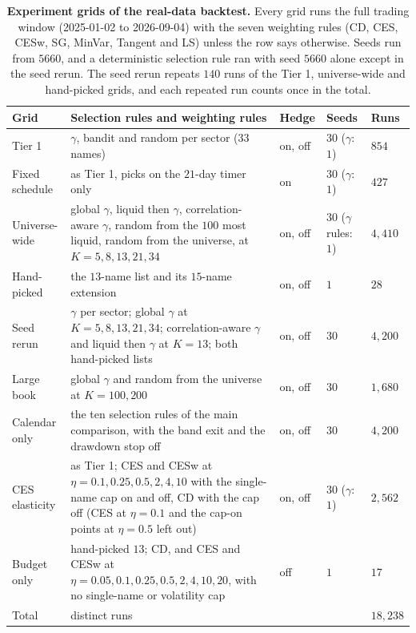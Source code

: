 \begin{table}[H]
\centering
\small
\caption{\textbf{Experiment grids of the real-data backtest.} Every grid runs the full trading window
(2025-01-02 to 2026-09-04) with the seven weighting rules (CD, CES, CESw, SG, MinVar, Tangent and LS) unless the
row says otherwise. Seeds run from $5660$, and a deterministic selection rule ran with seed $5660$ alone except in
the seed rerun. The seed rerun repeats $140$ runs of the Tier 1, universe-wide and hand-picked grids, and each repeated run counts
once in the total.}
\label{tab:S-grids}
\begin{tabular}{@{}p{2.2cm}p{5.4cm}lll@{}}
\toprule
\textbf{Grid} & \textbf{Selection rules and weighting rules} & \textbf{Hedge} & \textbf{Seeds} &
  \textbf{Runs} \\
\midrule
Tier 1 & $\gamma$, bandit and random per sector ($33$ names) & on, off & $30$ ($\gamma$: $1$) & $854$ \\
Fixed schedule & as Tier 1, picks on the $21$-day timer only & on & $30$ ($\gamma$: $1$) & $427$ \\
Universe-wide & global $\gamma$, liquid then $\gamma$, correlation-aware $\gamma$, random from the $100$ most
  liquid, random from the universe, at $K = 5, 8, 13, 21, 34$ & on, off & $30$ ($\gamma$ rules: $1$) &
  $4{,}410$ \\
Hand-picked & the $13$-name list and its $15$-name extension & on, off & $1$ & $28$ \\
Seed rerun & $\gamma$ per sector; global $\gamma$ at $K = 5, 8, 13, 21, 34$; correlation-aware $\gamma$ and liquid
  then $\gamma$ at $K = 13$; both hand-picked lists & on, off & $30$ & $4{,}200$ \\
Large book & global $\gamma$ and random from the universe at $K = 100, 200$ & on, off & $30$ & $1{,}680$ \\
Calendar only & the ten selection rules of the main comparison, with the band exit and the drawdown stop off &
  on, off & $30$ & $4{,}200$ \\
CES elasticity & as Tier 1; CES and CESw at $\eta = 0.1, 0.25, 0.5, 2, 4, 10$ with the single-name cap on and
  off, CD with the cap off (CES at $\eta = 0.1$ and the cap-on points at $\eta = 0.5$ left out) & on, off &
  $30$ ($\gamma$: $1$) & $2{,}562$ \\
Budget only & hand-picked $13$; CD, and CES and CESw at $\eta = 0.05, 0.1, 0.25, 0.5, 2, 4, 10, 20$, with no
  single-name or volatility cap & off & $1$ & $17$ \\
\midrule
Total & distinct runs & & & $18{,}238$ \\
\bottomrule
\end{tabular}
\end{table}
